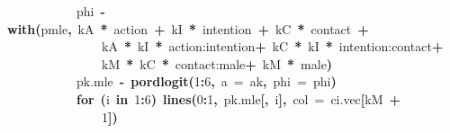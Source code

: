 \documentclass{article}
\makeatletter
\newcommand{\hlnumber}[1]{\textcolor[rgb]{0,0,0}{#1}}%
\newcommand{\hlfunctioncall}[1]{\textcolor[rgb]{.5,0,.33}{\textbf{#1}}}%
\newcommand{\hlkeyword}[1]{\textbf{#1}}%
\newcommand{\hlargument}[1]{\textcolor[rgb]{.69,.25,.02}{#1}}%
\newcommand{\hlassignement}[1]{\textbf{#1}}%
\newcommand{\hlsymbol}[1]{#1}%
\newcommand{\hlstd}[1]{\textcolor[rgb]{0,0,0}{#1}}%
\newenvironment{kframe}{%
 \def\FrameCommand##1{\hskip\@totalleftmargin \hskip-\fboxsep
 \colorbox{shadecolor}{##1}\hskip-\fboxsep
     \hskip-\linewidth \hskip-\@totalleftmargin \hskip\columnwidth}%
 \MakeFramed {\advance\hsize-\width
   \@totalleftmargin\z@ \linewidth\hsize
   \@setminipage}}%
 {\par\unskip\endMakeFramed}
\newenvironment{knitrout}{}{} %
\makeatother
\begin{document}
\begin{knitrout}
{\begin{kframe}
\begin{flushleft}
\hlstd{}{\ }{\ }{\ }{\ }{\ }{\ }{\ }{\ }{\ }{\ }{\ }{\ }\hlsymbol{phi}\hlsymbol{}{\ }\hlassignement{\usebox{\hlnormalsizeboxlessthan}-}{\ }\hlfunctioncall{with}\hlkeyword{(}\hlsymbol{pmle}\hlkeyword{,}{\ }\hlsymbol{kA}{\ }\hlkeyword{*}{\ }\hlsymbol{action}{\ }\hlkeyword{+}{\ }\hlsymbol{kI}{\ }\hlkeyword{*}{\ }\hlsymbol{intention}{\ }\hlkeyword{+}{\ }\hlsymbol{kC}{\ }\hlkeyword{*}{\ }\hlsymbol{contact}{\ }\hlkeyword{+}\hspace*{\fill}\\
\hlstd{}{\ }{\ }{\ }{\ }{\ }{\ }{\ }{\ }{\ }{\ }{\ }{\ }{\ }{\ }{\ }{\ }\hlsymbol{kA}{\ }\hlkeyword{*}{\ }\hlsymbol{kI}{\ }\hlkeyword{*}{\ }\hlsymbol{\usebox{\hlnormalsizeboxbacktick}action:intention\usebox{\hlnormalsizeboxbacktick}}{\ }\hlkeyword{+}{\ }\hlsymbol{kC}{\ }\hlkeyword{*}{\ }\hlsymbol{kI}{\ }\hlkeyword{*}{\ }\hlsymbol{\usebox{\hlnormalsizeboxbacktick}intention:contact\usebox{\hlnormalsizeboxbacktick}}{\ }\hlkeyword{+}\hspace*{\fill}\\
\hlstd{}{\ }{\ }{\ }{\ }{\ }{\ }{\ }{\ }{\ }{\ }{\ }{\ }{\ }{\ }{\ }{\ }\hlsymbol{kM}{\ }\hlkeyword{*}{\ }\hlsymbol{kC}{\ }\hlkeyword{*}{\ }\hlsymbol{\usebox{\hlnormalsizeboxbacktick}contact:male\usebox{\hlnormalsizeboxbacktick}}{\ }\hlkeyword{+}{\ }\hlsymbol{kM}{\ }\hlkeyword{*}{\ }\hlsymbol{male}\hlkeyword{)}\hspace*{\fill}\\
\hlstd{}{\ }{\ }{\ }{\ }{\ }{\ }{\ }{\ }{\ }{\ }{\ }{\ }\hlsymbol{pk.mle}{\ }\hlassignement{\usebox{\hlnormalsizeboxlessthan}-}{\ }\hlfunctioncall{pordlogit}\hlkeyword{(}\hlnumber{1}\hlkeyword{:}\hlnumber{6}\hlkeyword{,}{\ }\hlargument{a}{\ }\hlargument{=}{\ }\hlsymbol{ak}\hlkeyword{,}{\ }\hlargument{phi}{\ }\hlargument{=}{\ }\hlsymbol{phi}\hlkeyword{)}\hspace*{\fill}\\
\hlstd{}{\ }{\ }{\ }{\ }{\ }{\ }{\ }{\ }{\ }{\ }{\ }{\ }\hlkeyword{for}{\ }\hlkeyword{(}\hlsymbol{i}{\ }\hlkeyword{in}{\ }\hlnumber{1}\hlkeyword{:}\hlnumber{6}\hlkeyword{)}{\ }\hlfunctioncall{lines}\hlkeyword{(}\hlnumber{0}\hlkeyword{:}\hlnumber{1}\hlkeyword{,}{\ }\hlsymbol{pk.mle}\hlkeyword{[}\hlkeyword{,}{\ }\hlsymbol{i}\hlkeyword{]}\hlkeyword{,}{\ }\hlargument{col}{\ }\hlargument{=}{\ }\hlsymbol{ci.vec}\hlkeyword{[}\hlsymbol{kM}{\ }\hlkeyword{+}\hspace*{\fill}\\
\hlstd{}{\ }{\ }{\ }{\ }{\ }{\ }{\ }{\ }{\ }{\ }{\ }{\ }{\ }{\ }{\ }{\ }\hlnumber{1}\hlkeyword{]}\hlkeyword{)}\hspace*{\fill}\\

\end{flushleft}
\end{kframe}}
\end{knitrout}
\end{document}
